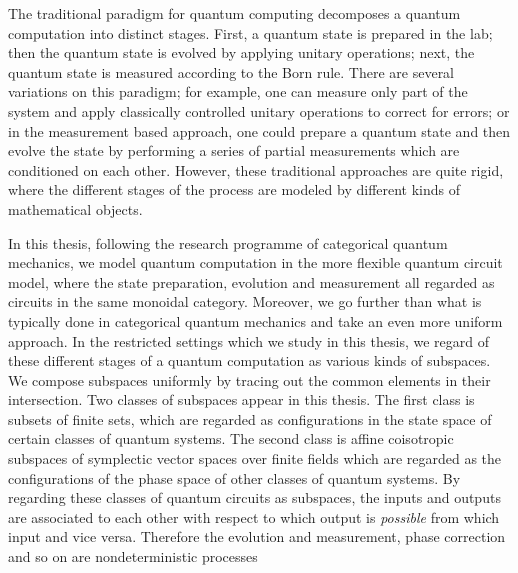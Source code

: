 
The traditional paradigm for quantum computing decomposes a quantum computation into  distinct stages. First, a quantum state is prepared in the lab; then the quantum state is evolved by applying unitary operations; next, the quantum state is measured according to the Born rule.  There are several variations on this paradigm; for example,  one can measure only part of the system and apply classically controlled unitary operations to correct for errors; or in the measurement based approach, one could prepare a quantum state and then evolve the state by performing a series of partial measurements which are conditioned on each other. However, these traditional approaches are quite rigid, where the different stages of the process are modeled by different kinds of mathematical objects.  %

In this thesis, following the research programme of categorical quantum mechanics, we model quantum computation in the more flexible quantum circuit model, where the state preparation, evolution and measurement all regarded as circuits in the same monoidal category. Moreover, we go further than what is typically done in  categorical quantum mechanics and  take an even more uniform approach.  In the restricted settings which we study in this thesis,  we regard of these different stages of a quantum computation as various kinds of subspaces.  We compose subspaces uniformly by tracing out the common elements in their intersection.  Two classes of subspaces appear in this thesis. The first class is subsets of finite sets, which are regarded as configurations in the state space of certain classes of quantum systems.  The second class is affine coisotropic subspaces of symplectic vector spaces over finite fields which are regarded as the configurations of  the phase space of other classes of quantum systems. By regarding these classes of quantum circuits as subspaces, the inputs and outputs are associated to each other with respect to which output is {\em possible} from which input and vice versa.  Therefore the evolution and measurement, phase correction and so on are nondeterministic processes

